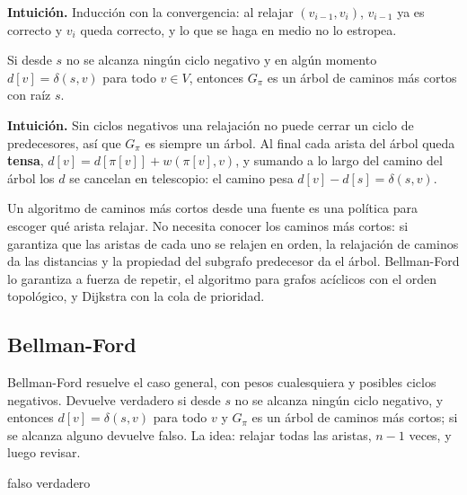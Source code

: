 \documentclass[11pt,letterpaper]{article}
\begin{document}
\textbf{Intuición.} Inducción con la convergencia: al relajar
$(v_{i-1}, v_i)$, $v_{i-1}$ ya es correcto y $v_i$ queda correcto, y
lo que se haga en medio no lo estropea.

\begin{proposicion}
  \label{prop:subgrafo-pred}
  Si desde $s$ no se alcanza ningún ciclo negativo y en algún momento
  $d[v] = \delta(s, v)$ para todo $v \in V$, entonces $G_\pi$ es un
  árbol de caminos más cortos con raíz $s$.
\end{proposicion}

\textbf{Intuición.} Sin ciclos negativos una relajación no puede
cerrar un ciclo de predecesores, así que $G_\pi$ es siempre un árbol.
Al final cada arista del árbol queda \textbf{tensa},
$d[v] = d[\pi[v]] + w(\pi[v], v)$, y sumando a lo largo del camino
del árbol los $d$ se cancelan en telescopio: el camino pesa
$d[v] - d[s] = \delta(s, v)$.

\begin{idea}
  Un algoritmo de caminos más cortos desde una fuente es una política
  para escoger qué arista relajar. No necesita conocer los caminos más
  cortos: si garantiza que las aristas de cada uno se relajen en
  orden, la relajación de caminos da las distancias y la propiedad del
  subgrafo predecesor da el árbol. Bellman-Ford lo garantiza a fuerza
  de repetir, el algoritmo para grafos acíclicos con el orden
  topológico, y Dijkstra con la cola de prioridad.
\end{idea}


\subsection*{Bellman-Ford}

Bellman-Ford resuelve el caso general, con pesos cualesquiera y
posibles ciclos negativos. Devuelve verdadero si desde $s$ no se
alcanza ningún ciclo negativo, y entonces $d[v] = \delta(s, v)$ para
todo $v$ y $G_\pi$ es un árbol de caminos más cortos; si se alcanza
alguno devuelve falso. La idea: relajar todas las aristas, $n - 1$
veces, y luego revisar.

\begin{algorithm}[H]
\caption{\textsc{Bellman-Ford}$(G, w, s)$}
\label{alg:bellman-ford}
\begin{algorithmic}[1]
  \State {}
   
      \State {}
    \EndFor
  \EndFor
   
      \State \Return falso 
    \EndIf
  \EndFor
  \State \Return verdadero
\EndProcedure
\end{algorithmic}
\end{algorithm}
\end{document}
